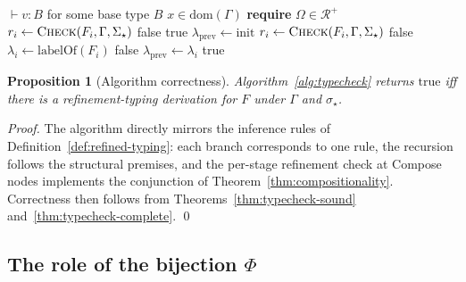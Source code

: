 \documentclass[twocolumn,11pt,a4paper]{article}
\newtheorem{proposition}[theorem]{Proposition}
\newcommand{\Sel}{\sigma}
\newcommand{\Frag}{F}
\newcommand{\Ctx}{\Gamma}
\begin{document}
\begin{algorithm}[H]
\caption{Refinement-type check}
\label{alg:typecheck}
\begin{algorithmic}[1]
    \State \Return $\vdash v : B$ for some base type $B$
    \State \Return $x \in \mathrm{dom}(\Gamma)$
    \State \textbf{require} $\Omega \in \mathcal{R}^+$
      \State $r_i \gets \textsc{Check}(F_i, \Gamma, \Sigma_\star)$
        \State \Return false
      \EndIf
    \EndFor
    \State \Return true
    \State $\lambda_{\mathrm{prev}} \gets \mathrm{init}$
      \State $r_i \gets \textsc{Check}(F_i, \Gamma, \Sigma_\star)$
        \State \Return false
      \EndIf
      \State $\lambda_i \gets \mathrm{labelOf}(F_i)$
            \State \Return false
          \EndIf
        \EndFor
      \EndIf
      \State $\lambda_{\mathrm{prev}} \gets \lambda_i$
    \EndFor
    \State \Return true
  \EndIf
\EndFunction
\end{algorithmic}
\end{algorithm}

\begin{proposition}[Algorithm correctness]
\label{prop:alg-correctness}
Algorithm~\ref{alg:typecheck} returns $\mathrm{true}$ iff there is a refinement-typing derivation for $\Frag$ under $\Ctx$ and $\Sel_\star$.
\end{proposition}

\begin{proof}
The algorithm directly mirrors the inference rules of Definition~\ref{def:refined-typing}: each branch corresponds to one rule, the recursion follows the structural premises, and the per-stage refinement check at Compose nodes implements the conjunction of Theorem~\ref{thm:compositionality}. Correctness then follows from Theorems~\ref{thm:typecheck-sound} and~\ref{thm:typecheck-complete}. \qed
\end{proof}

\subsection{The role of the bijection $\Phi$}
\end{document}
